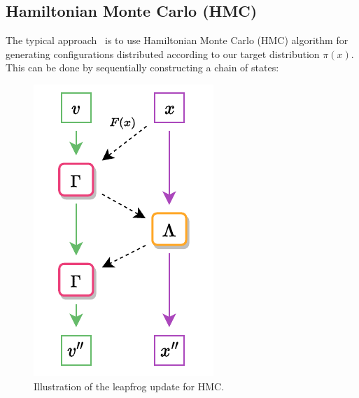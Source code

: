 \documentclass[a4paper,11pt]{article}
\begin{document}
\subsection{\label{subsec:hmc}Hamiltonian Monte Carlo (HMC)}
%
The typical approach~\cite{foreman_deep_2021,foreman_leapfroglayers_2022} is to use 
%
Hamiltonian Monte Carlo (HMC) algorithm for generating configurations 
%
distributed according to our target distribution $\pi(x)$.
%
This can be done by sequentially constructing a chain of states:
%
\begin{figure}
  \begin{center}
  \includegraphics[width=\linewidth]{assets/hmc-update10.pdf}
  \caption{\label{fig:hmc-update}Illustration of the leapfrog update for HMC.}
  \end{center}
\end{figure}
\end{document}
